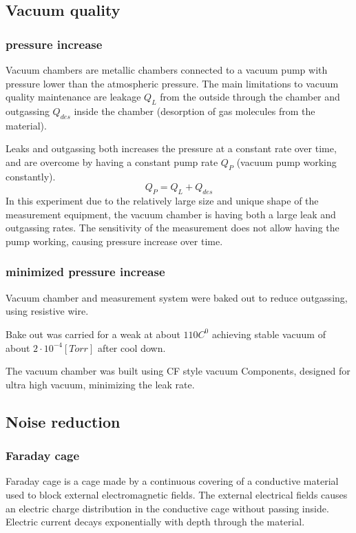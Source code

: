 \documentclass[\main/master.tex]{subfiles}
\begin{document}
\subsection{Vacuum quality}
\subsubsection{pressure increase}
\par\noindent
Vacuum chambers are metallic chambers connected to a vacuum pump with pressure lower than the atmospheric pressure. The main limitations to vacuum quality maintenance are leakage $Q_L$ from the outside through the chamber and outgassing $Q_{des}$ inside the chamber (desorption of gas molecules from the material).
\par\noindent
Leaks and outgassing both increases the pressure at a constant rate over time, and are overcome by having a constant pump rate $Q_P$ (vacuum pump working constantly).   
\begin{equation}
Q_P = Q_L + Q_{des}  \label{eqn:vacuum_equilibrium}
\end{equation}
In this experiment due to the relatively large size and unique shape of the measurement equipment, the vacuum chamber is having both a large leak and outgassing rates. The sensitivity of the measurement does not allow having the pump working, causing pressure increase over time.
\subsubsection{minimized pressure increase}
\par\noindent
Vacuum chamber and measurement system were baked out to reduce outgassing, using resistive wire. 
\par\noindent
Bake out was carried for a weak at about $110 C^0$ achieving stable vacuum of about $2\cdot 10^{−4} [Torr]$ after cool down.
\par\noindent
The vacuum chamber was built using CF style vacuum Components, designed for ultra high vacuum, minimizing the leak rate.


\subsection{Noise reduction}
\subsubsection{Faraday cage}
\par\noindent
Faraday cage is a cage made by a continuous covering of a conductive material used to block external electromagnetic fields. The external electrical fields causes an electric charge distribution in the conductive cage without passing inside. Electric current decays exponentially with depth through the material.
\end{document}
